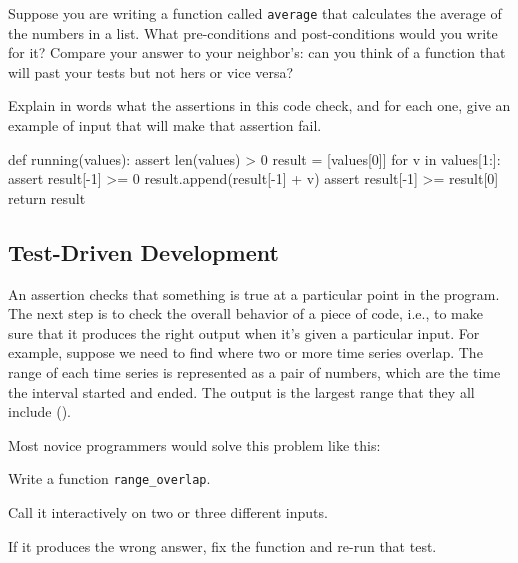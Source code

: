 \documentclass{book}
\begin{document}
\begin{challenge}
  Suppose you are writing a function called \texttt{average} that
  calculates the average of the numbers in a list. What pre-conditions
  and post-conditions would you write for it? Compare your answer to
  your neighbor's: can you think of a function that will past your tests
  but not hers or vice versa?
\end{challenge}

\begin{challenge}
  Explain in words what the assertions in this code check, and for each
  one, give an example of input that will make that assertion fail.

\begin{VerbIn}
def running(values):
    assert len(values) > 0
    result = [values[0]]
    for v in values[1:]:
        assert result[-1] >= 0
        result.append(result[-1] + v)
    assert result[-1] >= result[0]
    return result
\end{VerbIn}
\end{challenge}

\subsection{Test-Driven Development}

An assertion checks that something is true at a particular point in the
program. The next step is to check the overall behavior of a piece of
code, i.e., to make sure that it produces the right output when it's
given a particular input. For example, suppose we need to find where two
or more time series overlap. The range of each time series is
represented as a pair of numbers, which are the time the interval
started and ended. The output is the largest range that they all
include ().


Most novice programmers would solve this problem like this:

\begin{swcenumerate}
\item
  Write a function \texttt{range\_overlap}.
\item
  Call it interactively on two or three different inputs.
\item
  If it produces the wrong answer, fix the function and re-run that
  test.
\end{swcenumerate}
\end{document}
